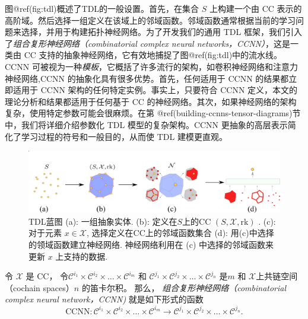\documentclass[
  12pt,
]{krantz}
\begin{document}
图@ref(fig:tdl)概述了TDL的一般设置。首先，在集合 \(S\) 上构建一个由 CC
表示的高阶域。然后选择一组定义在该域上的邻域函数。邻域函数通常根据当前的学习问题来选择，并用于构建拓扑神经网络。为了开发我们的通用
TDL 框架，我们引入了\emph{组合复形神经网络（combinatorial complex neural
networks，CCNN）}，这是一类由 CC
支持的抽象神经网络，它有效地捕捉了图@ref(fig:tdl)中的流水线。CCNN
可被视为一种\emph{模板}，它概括了许多流行的架构，如卷积神经网络和注意力神经网络,CCNN
的抽象化具有很多优势。首先，任何适用于 CCNN 的结果都立即适用于 CCNN
架构的任何特定实例。事实上，只要符合 CCNN
定义，本文的理论分析和结果都适用于任何基于 CC
的神经网络。其次，如果神经网络的架构复杂，使用特定参数可能会很麻烦。在第
@ref(building-ccnns-tensor-diagrams)节中，我们将详细介绍参数化 TDL
模型的复杂架构。CCNN
更抽象的高层表示简化了学习过程的符号和一般目的，从而使 TDL 建模更直观。

\begin{figure}

{\centering \includegraphics{figures/tdl_blue_print} 

}

\caption{TDL蓝图 (a): 一组抽象实体. (b): 定义在$S$上的CC $(S, \mathcal{X}, \mbox{rk})$ . (c): 对于元素 $x \in \mathcal{X}$, 选择定义在CC上的邻域函数集合 (d): 用(c)中选择的领域函数建立神经网络. 神经网络利用在 (c) 中选择的邻域函数来更新 $x$ 上支持的数据.}\label{fig:tdl}
\end{figure}

\label{hoans-definition}
令 \(\mathcal{X}\) 是 CC，
令\(\mathcal{C}^{i_1}\times\mathcal{C}^{i_2}\times \ldots \times  \mathcal{C}^{i_m}\)
和
\(\mathcal{C}^{j_1}\times\mathcal{C}^{j_2}\times \ldots \times  \mathcal{C}^{j_n}\)
是\(m\) 和 \(\mathcal{X}\)上共链空间（cochain spaces）\(n\) 的笛卡尔积。
那么， \emph{组合复形神经网络（combinatorial complex neural
network，CCNN)} 就是如下形式的函数 \begin{equation*}
\mbox{CCNN}: \mathcal{C}^{i_1}\times\mathcal{C}^{i_2}\times \ldots \times  \mathcal{C}^{i_m} \longrightarrow \mathcal{C}^{j_1}\times\mathcal{C}^{j_2}\times \ldots \times \mathcal{C}^{j_n}.
\end{equation*}
\end{document}
